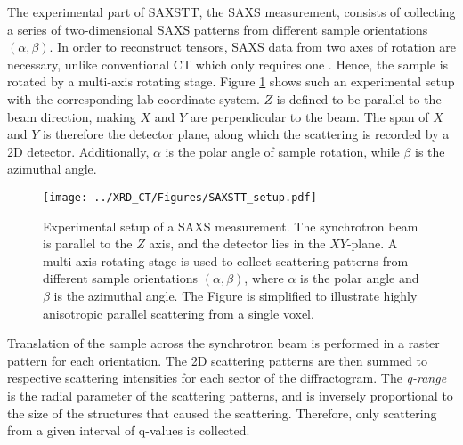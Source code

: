 The experimental part of SAXSTT, the SAXS measurement, consists of collecting a series of two-dimensional SAXS patterns from different sample orientations $\left(\alpha,\beta\right)$.
In order to reconstruct tensors, SAXS data from two axes of rotation are necessary, unlike conventional CT which only requires one \cite{liebi2018small}.
Hence, the sample is rotated by a multi-axis rotating stage.
Figure \ref{fig:SAXS_setup} shows such an experimental setup with the corresponding lab coordinate system.
$Z$ is defined to be parallel to the beam direction, making $X$ and $Y$ are perpendicular to the beam.
The span of $X$ and $Y$ is therefore the detector plane, along which the scattering is recorded by a 2D detector.
Additionally, $\alpha$ is the polar angle of sample rotation, while $\beta$ is the azimuthal angle.

\begin{figure}[h!]
    \centering
    \texttt{[image: ../XRD\_CT/Figures/SAXSTT\_setup.pdf]}
    \caption[Experimental Setup of SAXS]{Experimental setup of a SAXS measurement.
        The synchrotron beam is parallel to the $Z$ axis, and the detector lies in the $XY$-plane.
        A multi-axis rotating stage is used to collect scattering patterns from different sample orientations $\left(\alpha,\beta\right)$,
        where $\alpha$ is the polar angle and $\beta$ is the azimuthal angle.
        The Figure is simplified to illustrate highly anisotropic parallel scattering from a single voxel.
    }
    \label{fig:SAXS_setup}
\end{figure}

Translation of the sample across the synchrotron beam is performed in a raster pattern for each orientation.
The 2D scattering patterns are then summed to respective scattering intensities for each sector of the diffractogram.
The \emph{q-range} is the radial parameter of the scattering patterns, and is inversely proportional to the size of the structures that caused the scattering.
Therefore, only scattering from a given interval of q-values is collected. %





